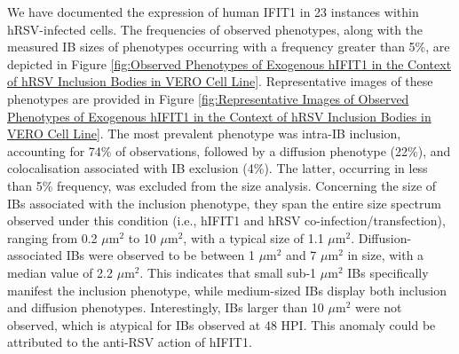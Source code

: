 We have documented the expression of human IFIT1 in 23 instances within hRSV-infected cells. The frequencies of observed phenotypes, along with the measured IB sizes of phenotypes occurring with a frequency greater than 5\%, are depicted in Figure \ref{fig:Observed Phenotypes of Exogenous hIFIT1 in the Context of hRSV Inclusion Bodies in VERO Cell Line}. Representative images of these phenotypes are provided in Figure \ref{fig:Representative Images of Observed Phenotypes of Exogenous hIFIT1 in the Context of hRSV Inclusion Bodies in VERO Cell Line}. The most prevalent phenotype was intra-IB inclusion, accounting for 74\% of observations, followed by a diffusion phenotype (22\%), and colocalisation associated with IB exclusion (4\%). The latter, occurring in less than 5\% frequency, was excluded from the size analysis. Concerning the size of IBs associated with the inclusion phenotype, they span the entire size spectrum observed under this condition (i.e., hIFIT1 and hRSV co-infection/transfection), ranging from 0.2 \(\mu \mbox{m}^2\) to 10 \(\mu \mbox{m}^2\), with a typical size of 1.1 \(\mu \mbox{m}^2\). Diffusion-associated IBs were observed to be between 1 \(\mu \mbox{m}^2\) and 7 \(\mu \mbox{m}^2\) in size, with a median value of 2.2 \(\mu \mbox{m}^2\). This indicates that small sub-1 \(\mu \mbox{m}^2\) IBs specifically manifest the inclusion phenotype, while medium-sized IBs display both inclusion and diffusion phenotypes. Interestingly, IBs larger than 10 \(\mu \mbox{m}^2\) were not observed, which is atypical for IBs observed at 48 HPI. This anomaly could be attributed to the anti-RSV action of hIFIT1.

